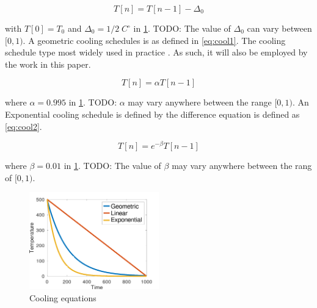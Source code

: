 \documentclass[11pt,a4paper,final]{article}
\newcommand{\Tau}{T}                        %
\begin{document}
\begin{equation}
\label{eq:cool0}
\Tau[n] = \Tau[n-1] - \Delta_0
\end{equation}

with \(\Tau[0] = \Tau_0\) and \(\Delta_0 = 1/2\; C^\circ\) in \ref{fig:cool}. TODO: The value of \(\Delta_0\) can vary between \([0,1)\). A
geometric cooling schedules is as defined in \ref{eq:cool1}. The cooling schedule type most widely used in practice
\cite{keller-2019-multi-objec}. As such, it will also be employed by the work in this paper.

\begin{equation}
\label{eq:cool1}
\Tau[n] = \alpha \Tau[n-1]
\end{equation}

where \(\alpha = 0.995\) in \ref{fig:cool}. TODO: \(\alpha\) may vary anywhere between the range \([0,1)\). An Exponential cooling schedule is
defined by the difference equation is defined as \ref{eq:cool2}.

\begin{equation}
\label{eq:cool2}
\Tau[n] = e^{-\beta}\Tau[n-1]
\end{equation}

where \(\beta = 0.01\) in \ref{fig:cool}. TODO: The value of \(\beta\) may vary anywhere between the rang of \([0, 1)\).

\begin{figure}[htbp]
\centering
\includegraphics[width=0.5\textwidth]{sections/img/cool_func.png}
\caption{\label{fig:cool}Cooling equations}
\end{figure}
\end{document}
